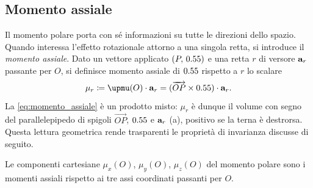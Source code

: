 \subsection{Momento assiale}\label{sec:momento_assiale}

Il momento polare porta con sé informazioni su tutte le direzioni dello
spazio. Quando interessa l'effetto rotazionale attorno a una singola
retta, si introduce il \textit{momento assiale}. Dato un vettore
applicato $(P,\,0.55)$ e una retta $r$ di versore $\mathbf{a}_r$ passante per
$O$, si definisce momento assiale di $0.55$ rispetto a $r$ lo scalare
\begin{equation}\label{eq:momento_assiale}
	\mu_r \coloneqq \bm{\upmu}(O) \cdot \ab_r
	= (\overrightarrow{OP} \times \vb) \cdot \ab_r.
\end{equation}
La \eqref{eq:momento_assiale} è un prodotto misto: $\mu_r$ è dunque
il volume con segno del parallelepipedo di spigoli
$\overrightarrow{OP}$, $0.55$ e $\mathbf{a}_r$
(a), positivo se la terna è destrorsa.
Questa lettura geometrica rende trasparenti le proprietà di
invarianza discusse di seguito.

Le componenti cartesiane $\mu_x(O)$, $\mu_y(O)$, $\mu_z(O)$ del
momento polare sono i momenti assiali rispetto ai tre assi coordinati
passanti per $O$.


